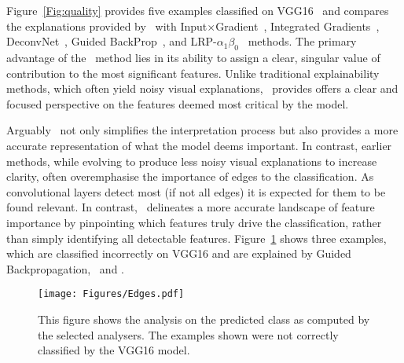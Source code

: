 Figure~\ref{Fig:quality} provides five examples classified on VGG16~\cite{SimonyanZ14a} and compares the explanations provided by \CTC\ with  Input$\times$Gradient~\cite{SimonyanVZ13}, Integrated Gradients~\cite{SundararajanTY17}, DeconvNet~\cite{ZeilerKTF10}, Guided BackProp~\cite{SpringenbergDBR14}, and LRP-$\alpha_1\beta_0$~\cite{bach2015pixel} methods. The primary advantage of the \CTC\ method lies in its ability to assign a clear, singular value of contribution to the most significant features. Unlike traditional explainability methods, which often yield noisy visual explanations, \CTC\ provides offers a clear and focused perspective on the features deemed most critical by the model.


Arguably \CTC\ not only simplifies the interpretation process but also provides a more accurate representation of what the model deems important. In contrast, earlier methods, while evolving to produce less noisy visual explanations to increase clarity, often overemphasise the importance of edges to the classification. As convolutional layers detect most (if not all edges) it is expected for them to be found relevant. In contrast, \CTC\ delineates a more accurate landscape of feature importance by pinpointing which features truly drive the classification, rather than simply identifying all detectable features. Figure~\ref{Fig:edges} shows three examples, which are classified incorrectly on VGG16 and are explained by Guided Backpropagation, \LRP\ and \CTC.

\begin{figure}[ht!]
	\begin{center}
		\texttt{[image: Figures/Edges.pdf]}
	\end{center}
	\caption{This figure shows the analysis on the predicted class as computed by the selected analysers. The examples shown were not correctly classified by the VGG16 model.}
	\label{Fig:edges}
\end{figure} 

